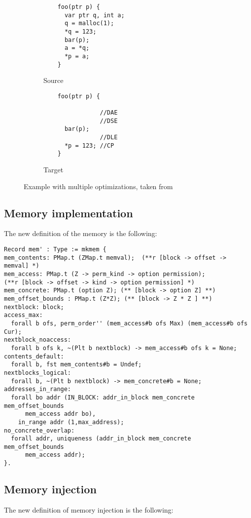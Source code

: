 \begin{figure}[H]
\begin{subfigure}{.48\textwidth}
  \begin{lstlisting}
    foo(ptr p) {
      var ptr q, int a;
      q = malloc(1);
      *q = 123;
      bar(p);
      a = *q;
      *p = a;
    }
  \end{lstlisting}
  \caption{Source}
  \label{fig:multiplebefore}
\end{subfigure}
\begin{subfigure}{.48\textwidth}
  \begin{lstlisting}
    foo(ptr p) {

                //DAE
                //DSE
      bar(p);
                //DLE
      *p = 123; //CP
    }
  \end{lstlisting}
  \caption{Target}
  \label{fig:multipleafter}
\end{subfigure}
\caption{Example with multiple optimizations, taken from~\cite{DBLP:conf/pldi/KangHMGZV15}}
\label{fig:multipleexamples}
\end{figure}

\subsection{Memory implementation}
The new definition of the memory is the following:

\begin{lstlisting}[basicstyle=\footnotesize]
Record mem' : Type := mkmem {
mem_contents: PMap.t (ZMap.t memval);  (**r [block -> offset -> memval] *)
mem_access: PMap.t (Z -> perm_kind -> option permission);
(**r [block -> offset -> kind -> option permission] *)
mem_concrete: PMap.t (option Z); (** [block -> option Z] **)
mem_offset_bounds : PMap.t (Z*Z); (** [block -> Z * Z ] **)
nextblock: block;
access_max:
  forall b ofs, perm_order'' (mem_access#b ofs Max) (mem_access#b ofs Cur);
nextblock_noaccess:
  forall b ofs k, ~(Plt b nextblock) -> mem_access#b ofs k = None;
contents_default:
  forall b, fst mem_contents#b = Undef;
nextblocks_logical:
  forall b, ~(Plt b nextblock) -> mem_concrete#b = None;
addresses_in_range:
  forall bo addr (IN_BLOCK: addr_in_block mem_concrete mem_offset_bounds
      mem_access addr bo),
    in_range addr (1,max_address);
no_concrete_overlap:
  forall addr, uniqueness (addr_in_block mem_concrete mem_offset_bounds
      mem_access addr);
}.
\end{lstlisting}

\subsection{Memory injection}
The new definition of memory injection is the following:


